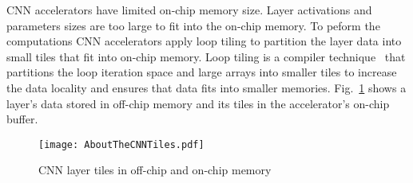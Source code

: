 CNN accelerators have limited on-chip memory size. Layer activations and parameters sizes are too large to fit into the on-chip memory. To peform the computations CNN accelerators apply loop tiling to partition the layer data into small tiles that fit into on-chip memory. Loop tiling is a compiler  technique~\cite{aho2006compilers} that partitions the loop iteration space and large arrays into smaller tiles to increase the data locality and ensures that data fits into smaller memories. Fig.~\ref{fig:partitioningDataUsingTiling} shows a layer's data stored in off-chip memory and its tiles in the accelerator's on-chip buffer.
\begin{figure}[!htb]
	\centering
	\captionsetup{font=sf}	
	\texttt{[image: AboutTheCNNTiles.pdf]}
	\caption{CNN layer tiles in off-chip and on-chip memory}
	\label{fig:partitioningDataUsingTiling}
\end{figure}


